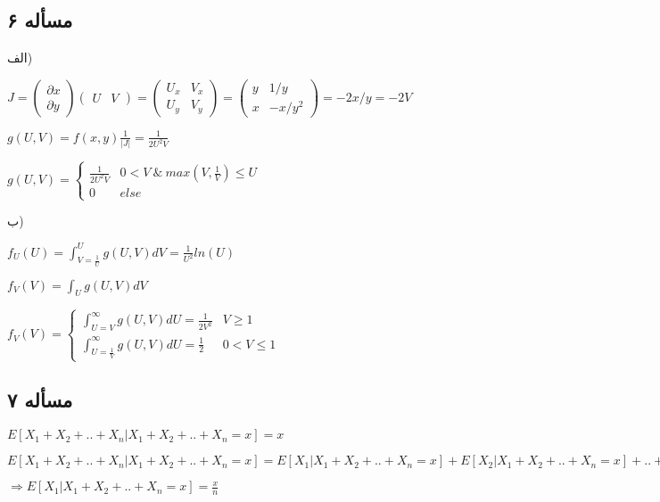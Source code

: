 \documentclass[12pt]{article}
\begin{document}
\subsection*{مسأله‌ ۶}
الف)
\begin{flushleft}
$J=
\begin{pmatrix} 
\partial x \\
\partial y
\end{pmatrix}
\begin{pmatrix} 
U & V
\end{pmatrix}
=
\begin{pmatrix} 
U_x & V_x \\
U_y & V_y
\end{pmatrix}
=
\begin{pmatrix} 
y & 1/y\\
x& -x/y^2
\end{pmatrix}
=
-2x/y=-2V
$

$g(U,V)=f(x,y)\frac{1}{|J|}=\frac{1}{2U^2V}$

$g(U,V)= \begin{cases} 
      \frac{1}{2U^2V} & 0< V\  \& \ max(V,\frac{1}{V}) \leq U \\
      0 & else
   \end{cases}
$

\end{flushleft}
ب)
\begin{flushleft}
$f_U(U)=\int_{V=\frac{1}{U}}^{U} g(U,V)dV=\frac{1}{U^2}ln(U)$

$f_V(V)=\int_{U} g(U,V)dV$

$f_V(V)=\begin{cases} 
      \int_{U=V}^{\infty} g(U,V)dU=\frac{1}{2V^2} & V\geq 1 \\
      \int_{U=\frac{1}{V}}^{\infty} g(U,V)dU=\frac{1}{2} & 0<V \leq 1
   \end{cases}$
\end{flushleft}
\subsection*{مسأله‌ ۷}
\begin{flushleft}
$E[X_1+X_2+..+X_n|X_1+X_2+..+X_n=x]=x$

$E[X_1+X_2+..+X_n|X_1+X_2+..+X_n=x]=E[X_1|X_1+X_2+..+X_n=x]+E[X_2|X_1+X_2+..+X_n=x]+..+E[X_n|X_1+X_2+..+X_n=x]=nE[X_1|X_1+X_2+..+X_n=x]$

$\Rightarrow E[X_1|X_1+X_2+..+X_n=x]=\frac{x}{n}$
\end{flushleft}
\end{document}
